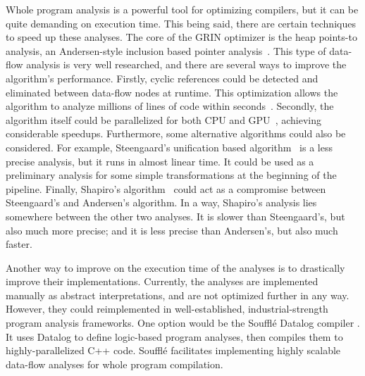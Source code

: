 \documentclass[main.tex]{subfiles}
\begin{document}
  Whole program analysis is a powerful tool for optimizing compilers, but it can be quite demanding on execution time. This being said, there are certain techniques to speed up these analyses. The core of the GRIN optimizer is the heap points-to analysis, an Andersen-style inclusion based pointer analysis~\cite{andersen-ptr}. This type of data-flow analysis is very well researched, and there are several ways to improve the algorithm's performance. Firstly, cyclic references could be detected and eliminated between data-flow nodes at runtime. This optimization allows the algorithm to analyze millions of lines of code within seconds~\cite{andersen-opt}. Secondly, the algorithm itself could be parallelized for both CPU and GPU~\cite{andersen-gpu}, achieving considerable speedups. Furthermore, some alternative algorithms could also be considered. For example, Steengaard's unification based algorithm~\cite{steensgaard-ptr} is a less precise analysis, but it runs in almost linear time. It could be used as a preliminary analysis for some simple transformations at the beginning of the pipeline. Finally, Shapiro's algorithm~\cite{shapiro-ptr} could act as a compromise between Steengaard's and Andersen's algorithm. In a way, Shapiro's analysis lies somewhere between the other two analyses. It is slower than Steengaard's, but also much more precise; and it is less precise than Andersen's, but also much faster.
  
  Another way to improve on the execution time of the analyses is to drastically improve their implementations. Currently, the analyses are implemented manually as abstract interpretations, and are not optimized further in any way. However, they could reimplemented in well-established, industrial-strength program analysis frameworks. One option would be the Soufflé Datalog compiler \cite{souffle}. It uses Datalog to define logic-based program analyses, then compiles them to highly-parallelized C++ code. Soufflé facilitates implementing highly scalable data-flow analyses for whole program compilation.
	
\end{document}
